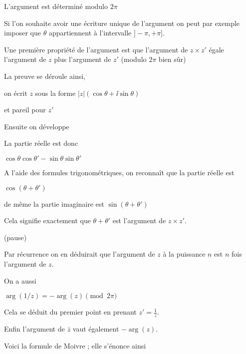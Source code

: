 \change


L'argument est déterminé modulo $2\pi$ 

\change

Si l'on souhaite avoir une écriture unique de l'argument on peut par exemple imposer
que $\theta$ appartiennent à l'intervalle $]-\pi,+\pi]$.



\diapo

Une première propriété de l'argument est que l'argument de
$z\times z'$ égale l'argument de $z$ plus l'argument de $z'$
(modulo $2\pi$ bien sûr)

\change

La preuve se déroule ainsi,

on écrit $z$ sous la forme $\left| z \right|  \left( \cos \theta + \ii  \sin \theta \right) $

et pareil pour $z'$

\change

Ensuite on développe

\change

La partie réelle est donc 

$\cos \theta \cos \theta' - \sin \theta     \sin \theta' $

A l'aide des formules trigonométriques, on reconnaît que la partie réelle est

$\cos(\theta + \theta')$

de même la partie imaginaire est $\sin(\theta + \theta')$

Cela signifie exactement que $\theta+\theta'$ est l'argument de $z\times z'$.

(pause)

\change

Par récurrence on en déduirait que l'argument de $z$
à la puissance $n$ est $n$ fois l'argument de $z$.

\change

On a aussi

 $\arg \left( 1 / z \right) = - \arg (z) \pmod {2\pi}$

Cela se déduit du premier point en prenant $z' = \frac 1 z$.

\change

Enfin l'argument de $\bar z$ vaut également $-\arg(z)$.


\diapo

Voici la formule de Moivre ; elle s'énonce ainsi

